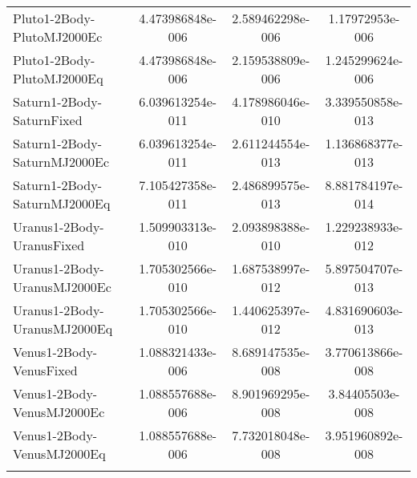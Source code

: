 \begin{table}[htbp!]
\begin{tabular}{lccc}
         Pluto1-2Body-PlutoMJ2000Ec & 4.473986848e-006 & 2.589462298e-006 & 1.17972953e-006 \\
         Pluto1-2Body-PlutoMJ2000Eq & 4.473986848e-006 & 2.159538809e-006 & 1.245299624e-006 \\
         Saturn1-2Body-SaturnFixed & 6.039613254e-011 & 4.178986046e-010 & 3.339550858e-013 \\
         Saturn1-2Body-SaturnMJ2000Ec & 6.039613254e-011 & 2.611244554e-013 & 1.136868377e-013 \\
         Saturn1-2Body-SaturnMJ2000Eq & 7.105427358e-011 & 2.486899575e-013 & 8.881784197e-014 \\
         Uranus1-2Body-UranusFixed & 1.509903313e-010 & 2.093898388e-010 & 1.229238933e-012 \\
         Uranus1-2Body-UranusMJ2000Ec & 1.705302566e-010 & 1.687538997e-012 & 5.897504707e-013 \\
         Uranus1-2Body-UranusMJ2000Eq & 1.705302566e-010 & 1.440625397e-012 & 4.831690603e-013 \\
         Venus1-2Body-VenusFixed & 1.088321433e-006 & 8.689147535e-008 & 3.770613866e-008 \\
         Venus1-2Body-VenusMJ2000Ec & 1.088557688e-006 & 8.901969295e-008 & 3.84405503e-008 \\
         Venus1-2Body-VenusMJ2000Eq & 1.088557688e-006 & 7.732018048e-008 & 3.951960892e-008 \\
      \hline\hline
      \label{Table: WinGMAT-MacGMAT CS Parameters Set 4} 
\end{tabular}
\end{table}
